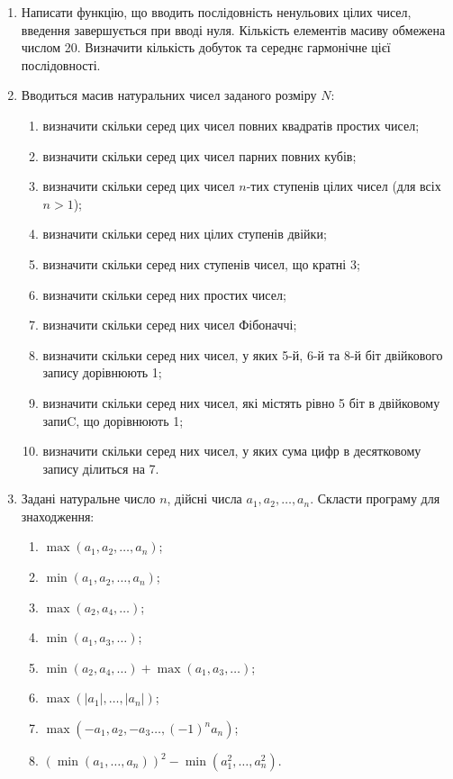 \documentclass[a5paper,titlepage,openany,twoside,draft]{book_unv}%
\makeatletter
\newcommand{\xslalph}[1]{\expandafter\@xslalph\csname c@#1\endcsname}
\newcommand{\@xslalph}[1]{%
    \ifcase#1\or а\or б\or в\or г\or д\or e\or є\or ж\or з\or i%
    \or й\or к\or л\or м\or н\or о\or п\or р\or с\or т%
    \or у\or ф\or х\or ц\or ч\or ш\or ю\or я\or аа\or бб\or вв%
    \else\@ctrerr\fi%
}
\makeatother
\begin{document}
\begin{enumerate}
\def\labelenumi{\arabic{enumi})}
\setcounter{enumi}{6}
\item
  Написати функцію, що вводить послідовність ненульових цілих чисел,
  введення завершується при вводі нуля. Кількість елементів масиву
  обмежена числом 20. Визначити кількість добуток та середнє гармонічне
  цієї послідовності.
\item
  Вводиться масив натуральних чисел заданого розміру $N$:
\begin{enumerate}[label=\xslalph*)]
\item визначити скільки серед цих чисел повних квадратів простих чисел;
\item визначити скільки серед цих чисел парних повних кубів;
\item визначити скільки серед цих чисел $n$-тих ступенів цілих чисел (для
всіх $n>1$);
\item визначити скільки серед них цілих ступенів двійки;
\item визначити скільки серед них ступенів чисел, що кратні 3;
\item визначити скільки серед них простих чисел;
\item визначити скільки серед них чисел Фібоначчі;
\item визначити скільки серед них чисел, у яких 5-й, 6-й та 8-й біт
двійкового запису дорівнюють 1;
\item визначити скільки серед них чисел, які містять рівно 5 біт в
двійковому запиC, що дорівнюють 1;
\item визначити скільки серед них чисел, у яких сума цифр в десятковому
запису ділиться на 7.
 \end{enumerate}

\item Задані натуральне число \(n\), дійсні числа
\(a_{1},a_{2},\ldots,a_{n}\). Скласти програму для знаходження:
  \begin{multicols}{2}
\begin{enumerate}[label=\xslalph*)]
\item
 \(\max\left( a_{1},a_{2},\ldots,a_{n} \right)\); 
\item
\(\min\left( a_{1},a_{2},\ldots,a_{n} \right)\);
\item \(\max\left( a_{2},a_{4},\ldots \right)\); 
\item
\(\min\left( a_{1},a_{3},\ldots \right)\);
\item
\(\min\left( a_{2},a_{4},\ldots \right) + \max\left( a_{1},a_{3},\ldots \right)\);
\item
\(\max\left( \left| a_{1} \right|,\ldots,\left| a_{n} \right| \right)\);
\item \(\max\left( -a_{1},a_{2}, -a_{3}\ldots,(-1)^{n}a_{n} \right)\);
\item
\(\left( \min\left( a_{1},\ldots,a_{n} \right) \right)^{2} - \min\left( a_{1}^{2},\ldots,a_{n}^{2} \right)\).


\end{enumerate}
\end{multicols}
\end{enumerate}
\end{document}
